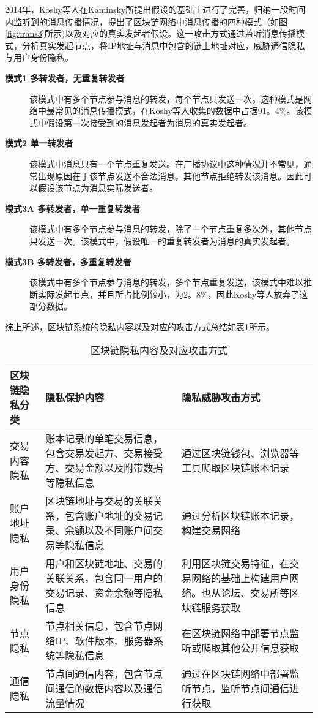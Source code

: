 2014年，Koshy等人在Kaminsky所提出假设的基础上进行了完善，归纳一段时间内监听到的消息传播情况，提出了区块链网络中消息传播的四种模式（如图\ref{fig:trans3}所示)以及对应的真实发起者假设。这一攻击方式通过监听消息传播模式，分析真实发起节点，将IP地址与消息中包含的链上地址对应，威胁通信隐私与用户身份隐私。

\begin{description}
  \item[\textbf{模式1 多转发者，无重复转发者}] 该模式中有多个节点参与消息的转发，每个节点只发送一次。这种模式是网络中最常见的消息传播模式，在Koshy等人收集的数据中占据91。4\%。该模式中假设第一次接受到的消息发起者为消息的真实发起者。
  \item[\textbf{模式2 单一转发者}] 该模式中消息只有一个节点重复发送。在广播协议中这种情况并不常见，通常出现原因在于该节点发送不合法消息，其他节点拒绝转发该消息。因此可以假设该节点为消息实际发送者。
  \item[\textbf{模式3A 多转发者，单一重复转发者}] 该模式中有多个节点参与消息的转发，除了一个节点重复多次外，其他节点只发送一次。该模式中，假设唯一的重复转发者为消息的真实发起者。
  \item[\textbf{模式3B 多转发者，多重复转发者}] 该模式中有多个节点参与消息的转发，多个节点重复发送，该模式中难以推断实际发起节点，并且所占比例较小，为2。8\%，因此Koshy等人放弃了这部分数据。
\end{description}

综上所述，区块链系统的隐私内容以及对应的攻击方式总结如表\ref{tab:privacy}所示。

\begin{table}[htbp]
	\centering  %
	\caption{区块链隐私内容及对应攻击方式}  %
	\label{tab:privacy}  %
	\begin{tabular}{|p{3cm}<{\centering}|p{5cm}<{\centering}|p{5cm}<{\centering}|}  
		\hline  %
		区块链隐私分类 & 隐私保护内容 & 隐私威胁攻击方式 \\  %
		\hline
		交易内容隐私 & 账本记录的单笔交易信息，包含交易发起方、交易接受方、交易金额以及附带数据等隐私信息 & 通过区块链钱包、浏览器等工具爬取区块链账本记录 \\
		\hline
		账户地址隐私 & 区块链地址与交易的关联关系，包含账户地址的交易记录、余额以及不同账户间交易等隐私信息 & 通过分析区块链账本记录，构建交易网络 \\ 
		\hline
		用户身份隐私 & 用户和区块链地址、交易的关联关系，包含同一用户的交易记录、资金余额等隐私信息 & 利用区块链交易特征，在交易网络的基础上构建用户网络。也从论坛、交易所等区块链服务获取 \\ 
		\hline
		节点隐私 & 节点相关信息，包含节点网络IP、软件版本、服务器系统等隐私信息 & 在区块链网络中部署节点监听或爬取其他公开信息获取 \\
		\hline
		通信隐私 & 节点间通信内容，包含节点间通信的数据内容以及通信流量情况 & 通过在区块链网络中部署监听节点，监听节点间通信进行获取 \\
		\hline
	\end{tabular}
\end{table}


